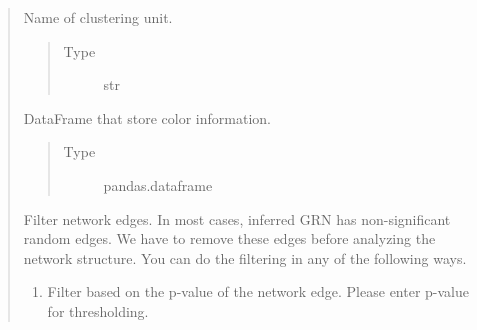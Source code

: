 \documentclass[letterpaper,10pt,english]{sphinxmanual}
\begin{document}
\begin{quote}
\begin{fulllineitems}
\begin{fulllineitems}
\begin{quote}
\begin{description}
\end{description}\end{quote}

\end{fulllineitems}


\begin{fulllineitems}
\label{\detokenize{modules/celloracle.network_analysis:celloracle.network_analysis.Links.name}}
Name of clustering unit.
\begin{quote}\begin{description}
\item[{Type}] \leavevmode
str

\end{description}\end{quote}

\end{fulllineitems}


\begin{fulllineitems}
\label{\detokenize{modules/celloracle.network_analysis:celloracle.network_analysis.Links.palette}}
DataFrame that store color information.
\begin{quote}\begin{description}
\item[{Type}] \leavevmode
pandas.dataframe

\end{description}\end{quote}

\end{fulllineitems}


\begin{fulllineitems}
\label{\detokenize{modules/celloracle.network_analysis:celloracle.network_analysis.Links.filter_links}}
Filter network edges.
In most cases, inferred GRN has non-significant random edges.
We have to remove these edges before analyzing the network structure.
You can do the filtering in any of the following ways.
\begin{enumerate}
\def\theenumi{\arabic{enumi}}
\def\labelenumi{(\theenumi )}
\makeatletter\def\p@enumii{\p@enumi (\theenumi )}\makeatother
\item {} 
Filter based on the p-value of the network edge.
Please enter p-value for thresholding.


\end{enumerate}
\end{fulllineitems}
\end{fulllineitems}
\end{quote}
\end{document}
